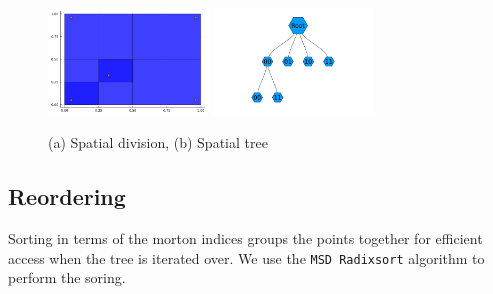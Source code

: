 \documentclass{juliacon}
\begin{document}
\begin{example}
  \begin{figure}
    \centerline{
      \includegraphics[width=10pc]{figures/spatial-division.png}
      \includegraphics[width=10pc]{figures/spatial-tree.png}
    }
    \caption{ (a) Spatial division, (b) Spatial tree }
    \label{spatial-tree}
  \end{figure}
\end{example}

\subsection{Reordering}
Sorting in terms of the morton indices groups the points together for efficient access
when the tree is iterated over. We use the \verb|MSD Radixsort| algorithm to perform the
soring.
\end{document}
